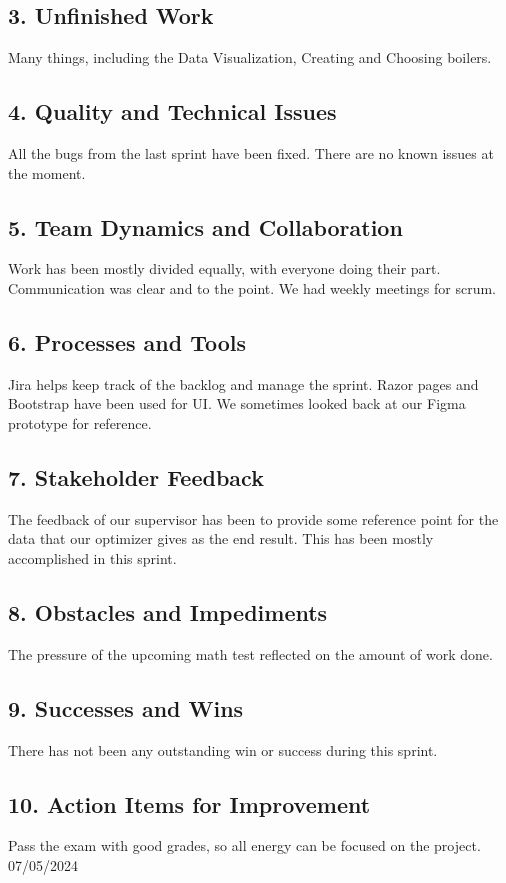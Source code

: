 \documentclass[12pt]{report}
\begin{document}
\subsection*{3. Unfinished Work}
Many things, including the Data Visualization, Creating and Choosing boilers.
\subsection*{4. Quality and Technical Issues}
All the bugs from the last sprint have been fixed. There are no known issues at the moment.
\subsection*{5. Team Dynamics and Collaboration}
Work has been mostly divided equally, with everyone doing their part. Communication was clear and to the point. We had weekly meetings for scrum.
\subsection*{6. Processes and Tools}
Jira helps keep track of the backlog and manage the sprint. Razor pages and Bootstrap have been used for UI. We sometimes looked back at our Figma prototype for reference.
\subsection*{7. Stakeholder Feedback}
The feedback of our supervisor has been to provide some reference point for the data that our optimizer gives as the end result. This has been mostly accomplished in this sprint.
\subsection*{8. Obstacles and Impediments}
The pressure of the upcoming math test reflected on the amount of work done.
\subsection*{9. Successes and Wins}
There has not been any outstanding win or success during this sprint.
\subsection*{10. Action Items for Improvement}
Pass the exam with good grades, so all energy can be focused on the project.
\hfill 07/05/2024
\end{document}

